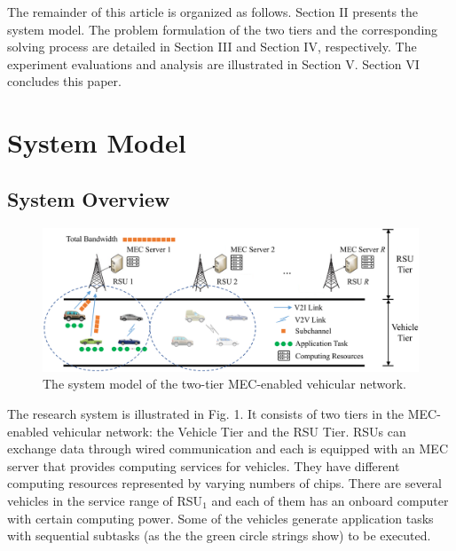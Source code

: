 \documentclass[lettersize,journal]{IEEEtran}
\begin{document}
The remainder of this article is organized as follows. Section II presents the system model. The problem formulation of the two tiers and the corresponding solving process are detailed in Section III and Section IV, respectively. The experiment evaluations and analysis are illustrated in Section V. Section VI concludes this paper.




\section{System Model}

\subsection{System Overview}
\begin{figure}[h]
\centering
\includegraphics[width=3.5 in]{Figures/System_Model_TVT_R1.png}
\caption{The system model of the two-tier MEC-enabled vehicular network.}
\label{fig_1}
\end{figure}


The research system is illustrated in Fig. 1.  It consists of two tiers in the MEC-enabled vehicular network: the Vehicle Tier and the RSU Tier. RSUs can exchange data through wired communication and each is equipped with an MEC server that provides computing services for vehicles. They have different computing resources represented by varying numbers of chips. There are several vehicles in the service range of RSU$_1$ and each of them has an onboard computer with certain computing power. Some of the vehicles generate application tasks with sequential subtasks (as the the green circle strings show) to be executed. 
\end{document}
